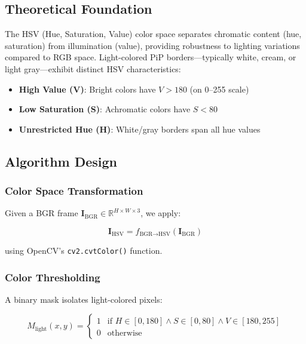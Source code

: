 \documentclass[11pt,a4paper]{article}
\begin{document}
\subsection{Theoretical Foundation}

The HSV (Hue, Saturation, Value) color space separates chromatic content (hue, saturation) from illumination (value), providing robustness to lighting variations compared to RGB space. Light-colored PiP borders---typically white, cream, or light gray---exhibit distinct HSV characteristics:

\begin{itemize}
    \item \textbf{High Value (V)}: Bright colors have $V > 180$ (on 0--255 scale)
    \item \textbf{Low Saturation (S)}: Achromatic colors have $S < 80$
    \item \textbf{Unrestricted Hue (H)}: White/gray borders span all hue values
\end{itemize}

\subsection{Algorithm Design}

\subsubsection{Color Space Transformation}

Given a BGR frame $\mathbf{I}_{\text{BGR}} \in \mathbb{R}^{H \times W \times 3}$, we apply:

\begin{equation}
\mathbf{I}_{\text{HSV}} = f_{\text{BGR} \rightarrow \text{HSV}}(\mathbf{I}_{\text{BGR}})
\end{equation}

using OpenCV's \texttt{cv2.cvtColor()} function.

\subsubsection{Color Thresholding}

A binary mask isolates light-colored pixels:

\begin{equation}
M_{\text{light}}(x, y) = \begin{cases} 
1 & \text{if } H \in [0, 180] \wedge S \in [0, 80] \wedge V \in [180, 255] \\ 
0 & \text{otherwise} 
\end{cases}
\end{equation}
\end{document}
